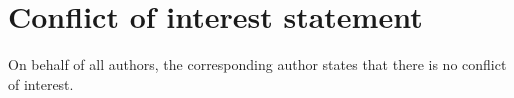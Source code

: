 \documentclass[11pt]{amsart}
\theoremstyle{plain}
\theoremstyle{definition}
\numberwithin{equation}{prop}
\begin{document}
\section*{Conflict of interest statement }
On behalf of all authors, the corresponding author states that there is no conflict of interest.





\end{document}
